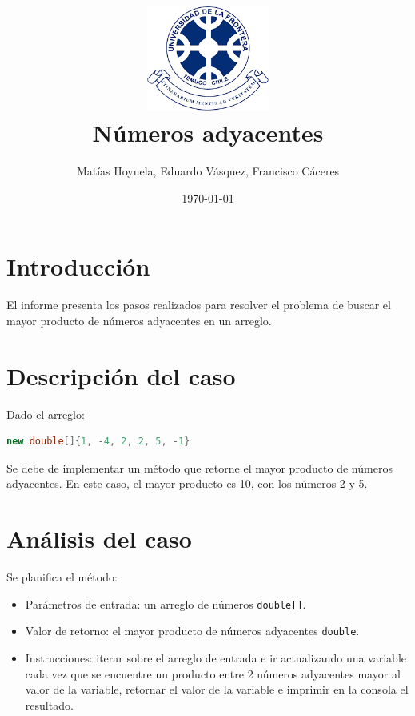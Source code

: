 \documentclass{article}
\begin{document}
\title{\includegraphics[width=0.3\textwidth]{imagenes/logo_ufro.png}\\[0.1cm]Números adyacentes}
\author{Matías Hoyuela, Eduardo Vásquez, Francisco Cáceres}
\date{\today}
\maketitle

\section{Introducción}
El informe presenta los pasos realizados para resolver el problema de buscar el mayor producto de números adyacentes en un arreglo.

\section{Descripción del caso}
Dado el arreglo:
\begin{lstlisting}[language=Java]
    new double[]{1, -4, 2, 2, 5, -1}
\end{lstlisting}
Se debe de implementar un método que retorne el mayor producto de números adyacentes. En este caso, el mayor producto es 10, con los números 2 y 5.

\section{Análisis del caso}

Se planifica el método:

\begin{itemize}
    \item Parámetros de entrada: un arreglo de números \texttt{double[]}.
    \item Valor de retorno: el mayor producto de números adyacentes \texttt{double}.
    \item Instrucciones: iterar sobre el arreglo de entrada e ir actualizando una variable cada vez que se encuentre un producto entre 2 números adyacentes mayor al valor de la variable, retornar el valor de la variable e imprimir en la consola el resultado.
\end{itemize}
\end{document}
